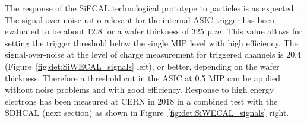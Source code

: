 
The response of the SiECAL technological prototype to particles is as expected~\cite{Kawagoe:2019dzh}. The signal-over-noise ratio relevant for the internal ASIC trigger has been evaluated to be about 12.8 for a wafer thickness of $325\,\upmu m$. This value allows for setting the trigger threshold below the single MIP level with high efficiency. %
The signal-over-noise at the level of charge measurement for triggered channels is 20.4 (Figure~\ref{fig:det:SiWECAL_signals} left), or better, depending on the wafer thickness. Therefore a threshold cut in the ASIC at 0.5 MIP can be applied without noise problems and with good efficiency.
 Response to high energy electrons has been measured at CERN in 2018 in a combined test with the SDHCAL (next section) as shown in Figure~\ref{fig:det:SiWECAL_signals} right.



